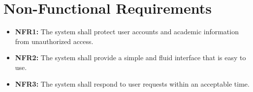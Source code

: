\section{Non-Functional Requirements}
\begin{itemize}
    \item \textbf{NFR1:} The system shall protect user accounts and academic information from unauthorized access.
    
    \item \textbf{NFR2:} The system shall provide a simple and fluid interface that is easy to use.
    
    \item \textbf{NFR3:} The system shall respond to user requests within an acceptable time.
\end{itemize}

